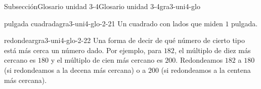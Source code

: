 \begin{subsectionptx}{Subsección}{Glosario unidad 3-4}{}{Glosario unidad 3-4}{}{}{gra3-uni4-glo}
\begin{descriptionlist}
\begin{dlimedium}{pulgada cuadrada}{gra3-uni4-glo-2-21}%
Un cuadrado con lados que miden \(1\) pulgada.%
\end{dlimedium}%
\begin{dlimedium}{redondear}{gra3-uni4-glo-2-22}%
Una forma de decir de qué número de cierto tipo está más cerca un número dado. Por ejemplo, para \(182\), el múltiplo de diez más cercano es \(180\) y el múltiplo de cien más cercano es \(200\). Redondeamos \(182\) a \(180\) (si redondeamos a la decena más cercana) o a \(200\) (si redondeamos a la centena más cercana).%
\end{dlimedium}%
\end{descriptionlist}
\end{subsectionptx}
%
%
\typeout{************************************************}
\typeout{************************************************}
%
